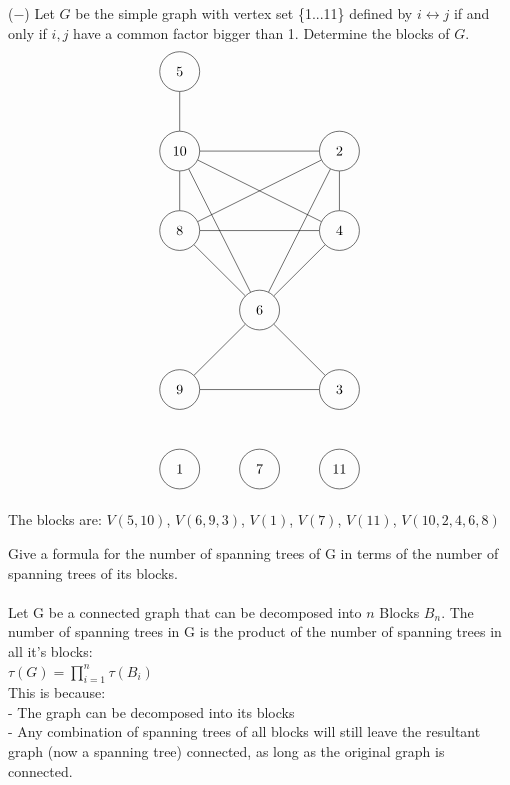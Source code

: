 \documentclass[12pt]{article}
\newenvironment{question}[2][Question]{\begin{trivlist}
\item[\hskip \labelsep {\bfseries #1}\hskip \labelsep {\bfseries #2.}]}{\end{trivlist}}
\begin{document}
\begin{question}{4}
($-$) Let $G$ be the simple graph with vertex set \{1...11\} defined by $i \leftrightarrow j$ if and only if $i, j$ have a common factor bigger than 1.  Determine the blocks of $G$.
\begin{align*}
\begin{tikzpicture}
\node[shape=circle,draw=black,minimum size=1cm] (A) at (0,10) {5};
\node[shape=circle,draw=black,minimum size=1cm] (B) at (0,8) {10};
\node[shape=circle,draw=black,minimum size=1cm] (C) at (4,8) {2};
\node[shape=circle,draw=black,minimum size=1cm] (D) at (0,6) {8};
\node[shape=circle,draw=black,minimum size=1cm] (E) at (4,6) {4};
\node[shape=circle,draw=black,minimum size=1cm] (F) at (2,4) {6};
\node[shape=circle,draw=black,minimum size=1cm] (G) at (0,2) {9};
\node[shape=circle,draw=black,minimum size=1cm] (H) at (4,2) {3};
\node[shape=circle,draw=black,minimum size=1cm] (I) at (0,0) {1};
\node[shape=circle,draw=black,minimum size=1cm] (I) at (2,0) {7};
\node[shape=circle,draw=black,minimum size=1cm] (I) at (4,0) {11};
\path [] (A) edge node[left] {} (B);
\path [] (B) edge node[left] {} (C);
\path [] (B) edge node[left] {} (D);
\path [] (B) edge node[left] {} (E);
\path [] (B) edge node[left] {} (F);
\path [] (C) edge node[left] {} (D);
\path [] (C) edge node[left] {} (E);
\path [] (C) edge node[left] {} (F);
\path [] (D) edge node[left] {} (E);
\path [] (D) edge node[left] {} (F);
\path [] (E) edge node[left] {} (F);
\path [] (F) edge node[left] {} (G);
\path [] (F) edge node[left] {} (H);
\path [] (G) edge node[left] {} (H);
\end{tikzpicture}
\end{align*}

The blocks are: $V(5, 10) $, $V(6,9,3)$, $V(1)$, $V(7)$, $V(11)$, $V(10,2,4,6,8)$ \\
\end{question}

\begin{question}{5}
	Give a formula for the number of spanning trees of G in terms of the number of spanning trees of its blocks.	\\ \\
	Let G be a connected graph that can be decomposed into $n$ Blocks $B_n$. The number of spanning trees in G is the product of the number of spanning trees in all it's blocks: \\

	$\tau(G) = \prod_{i=1}^{n}\tau(B_i)$\\
	This is because:\\
	- The graph can be decomposed into its blocks\\
	- Any combination of spanning trees of all blocks will still leave the resultant graph (now a spanning tree) connected, as long as the original graph is connected. \\
\end{question}
\end{document}
